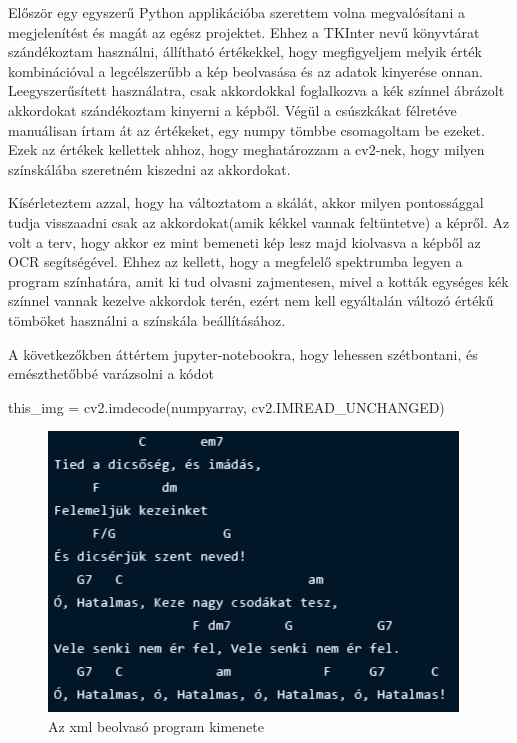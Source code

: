 
Először egy egyszerű Python applikációba szerettem volna megvalósítani a megjelenítést és magát az egész projektet. Ehhez a TKInter nevű könyvtárat szándékoztam használni, állítható értékekkel, hogy megfigyeljem melyik érték kombinációval a legcélszerűbb a kép beolvasása és az adatok kinyerése onnan. Leegyszerűsített használatra, csak akkordokkal foglalkozva a kék színnel ábrázolt akkordokat szándékoztam kinyerni a képből. Végül a csúszkákat félretéve manuálisan írtam át az értékeket, egy numpy tömbbe csomagoltam be ezeket. Ezek az értékek kellettek ahhoz, hogy meghatározzam a cv2-nek, hogy milyen színskálába szeretném kiszedni az akkordokat. 
\par
Kísérleteztem azzal, hogy ha változtatom a skálát, akkor milyen pontossággal tudja visszaadni csak az akkordokat(amik kékkel vannak feltüntetve) a képről. Az volt a terv, hogy akkor ez mint bemeneti kép lesz majd kiolvasva a képből az OCR segítségével. Ehhez az kellett, hogy a megfelelő spektrumba legyen a program színhatára, amit ki tud olvasni zajmentesen, mivel a kották egységes kék színnel vannak kezelve akkordok terén, ezért nem kell egyáltalán változó értékű tömböket használni a színskála beállításához.
\par

A következőkben áttértem jupyter-notebookra, hogy lehessen szétbontani, és emészthetőbbé varázsolni a kódot

\begin{python}
this_img = cv2.imdecode(numpyarray, cv2.IMREAD_UNCHANGED)	
\end{python}

\begin{figure}[h]
	\includegraphics[scale=1]{images/output_tied.png}
	\caption{Az xml beolvasó program kimenete}
	\label{fig:output1}
\end{figure}

